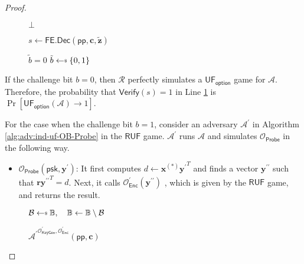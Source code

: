 \begin{proof}
\begin{figure}[h]
\begin{minipage}[t]{0.6\linewidth}
\begin{algorithm}[H]
\begin{algorithmic}[1]

			\State \Return $\bot$

		\EndIf

		\State $s \gets \textsf{FE.Dec}( \textsf{pp}, \mathbf{c}, \mathbf{\tilde{z}} )$

		 \label{alg:red:ind-uf-OB-Probe:verify}
			\State \Return $\tilde{b} = 0$
		\Else
			\State \Return $\tilde{b} \getsdollar \{0, 1\}$
		\EndIf

	\end{algorithmic}
	\end{algorithm}
	\end{minipage}
	
\end{figure}

If the challenge bit $b = 0$, then $\mathcal{R}$ perfectly simulates a $\textsf{UF}_\textsf{option}$ game for $\mathcal{A}$. Therefore, the probability that $\textsf{Verify}(s) = 1$ in Line \ref{alg:red:ind-uf-OB-Probe:verify} is $\Pr[\textsf{UF}_\textsf{option}(\mathcal{A}) \to 1]$.

For the case when the challenge bit $b = 1$, consider an adversary $\mathcal{A}^\prime$ in Algorithm \ref{alg:adv:ind-uf-OB-Probe} in the $\textsf{RUF}$ game. $\mathcal{A}^\prime$ runs $\mathcal{A}$ and simulates $\mathcal{O}_{\textsf{Probe}}$ in the following way.

\begin{itemize}

	\item $\mathcal{O}_{\textsf{Probe}}( \textsf{psk}, \mathbf{y}^\prime )$: It first computes $d \gets \mathbf{x}^{(*)}{\mathbf{y}^\prime}^T$ and finds a vector $\mathbf{y}^{\prime\prime}$ such that $\mathbf{r}{\mathbf{y}^{\prime\prime}}^T = d$. Next, it calls $\mathcal{O}^\prime_{\textsf{Enc}} (\mathbf{y}^{\prime\prime} )$ , which is given by the $\textsf{RUF}$ game, and returns the result.

\end{itemize}

\begin{figure}[h]
\centering
	
	\begin{minipage}[t]{0.8\linewidth}
	\centering
	\begin{algorithm}[H]
	\caption{$ {\mathcal{A}^\prime}^{ \mathcal{O}^\prime_{\textsf{KeyGen}}, \mathcal{O}^\prime_{\textsf{Enc}} } (\textsf{pp}, \mathbf{c}) $}
	\label{alg:adv:ind-uf-OB-Probe}
	\begin{algorithmic}[1]
		\State $\mathcal{B} \getsdollar \mathbb{B}, \quad \mathbb{B} \gets \mathbb{B} \setminus \mathcal{B}$ \label{alg:adv:ind-uf-OB-Probe:B}
		

\end{algorithmic}
\end{algorithm}
\end{minipage}
\end{figure}
\end{proof}
